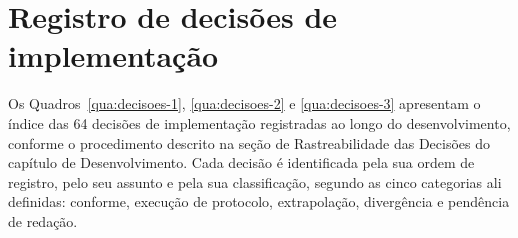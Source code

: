 \chapter{Registro de decisões de implementação}\label{apendice:decisoes}

Os Quadros~\ref{qua:decisoes-1}, \ref{qua:decisoes-2} e \ref{qua:decisoes-3} apresentam o índice das 64 decisões de implementação registradas ao longo do desenvolvimento, conforme o procedimento descrito na seção de Rastreabilidade das Decisões do capítulo de Desenvolvimento. Cada decisão é identificada pela sua ordem de registro, pelo seu assunto e pela sua classificação, segundo as cinco categorias ali definidas: conforme, execução de protocolo, extrapolação, divergência e pendência de redação.

